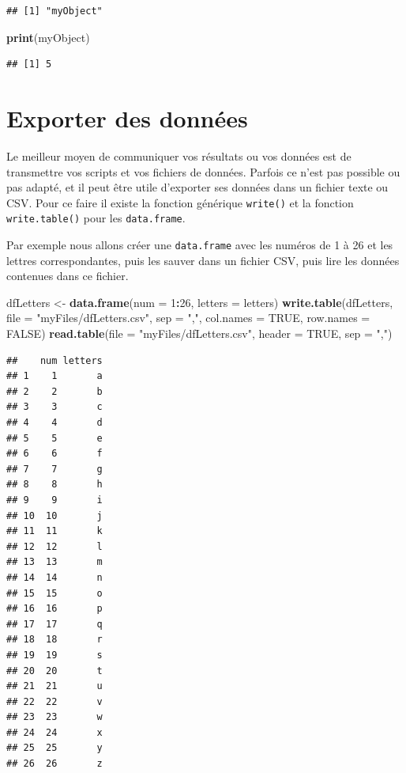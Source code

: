 \documentclass[]{book}
\newenvironment{Shaded}{\begin{snugshade}}{\end{snugshade}}
\newcommand{\DataTypeTok}[1]{\textcolor[rgb]{0.13,0.29,0.53}{#1}}
\newcommand{\DecValTok}[1]{\textcolor[rgb]{0.00,0.00,0.81}{#1}}
\newcommand{\KeywordTok}[1]{\textcolor[rgb]{0.13,0.29,0.53}{\textbf{#1}}}
\newcommand{\NormalTok}[1]{#1}
\newcommand{\OperatorTok}[1]{\textcolor[rgb]{0.81,0.36,0.00}{\textbf{#1}}}
\newcommand{\OtherTok}[1]{\textcolor[rgb]{0.56,0.35,0.01}{#1}}
\newcommand{\StringTok}[1]{\textcolor[rgb]{0.31,0.60,0.02}{#1}}
\begin{document}
\begin{verbatim}
## [1] "myObject"
\end{verbatim}

\begin{Shaded}
\begin{Highlighting}[]
\KeywordTok{print}\NormalTok{(myObject)}
\end{Highlighting}
\end{Shaded}

\begin{verbatim}
## [1] 5
\end{verbatim}

\hypertarget{l016write}{%
\section{Exporter des données}\label{l016write}}

Le meilleur moyen de communiquer vos résultats ou vos données est de transmettre vos scripts et vos fichiers de données. Parfois ce n'est pas possible ou pas adapté, et il peut être utile d'exporter ses données dans un fichier texte ou CSV. Pour ce faire il existe la fonction générique \texttt{write()} et la fonction \texttt{write.table()} pour les \texttt{data.frame}.

Par exemple nous allons créer une \texttt{data.frame} avec les numéros de 1 à 26 et les lettres correspondantes, puis les sauver dans un fichier CSV, puis lire les données contenues dans ce fichier.

\begin{Shaded}
\begin{Highlighting}[]
\NormalTok{dfLetters <-}\StringTok{ }\KeywordTok{data.frame}\NormalTok{(}\DataTypeTok{num =} \DecValTok{1}\OperatorTok{:}\DecValTok{26}\NormalTok{, }\DataTypeTok{letters =}\NormalTok{ letters)}
\KeywordTok{write.table}\NormalTok{(dfLetters, }\DataTypeTok{file =} \StringTok{"myFiles/dfLetters.csv"}\NormalTok{, }
  \DataTypeTok{sep =} \StringTok{","}\NormalTok{, }\DataTypeTok{col.names =} \OtherTok{TRUE}\NormalTok{, }\DataTypeTok{row.names =} \OtherTok{FALSE}\NormalTok{)}
\KeywordTok{read.table}\NormalTok{(}\DataTypeTok{file =} \StringTok{"myFiles/dfLetters.csv"}\NormalTok{, }\DataTypeTok{header =} \OtherTok{TRUE}\NormalTok{, }\DataTypeTok{sep =} \StringTok{","}\NormalTok{)}
\end{Highlighting}
\end{Shaded}

\begin{verbatim}
##    num letters
## 1    1       a
## 2    2       b
## 3    3       c
## 4    4       d
## 5    5       e
## 6    6       f
## 7    7       g
## 8    8       h
## 9    9       i
## 10  10       j
## 11  11       k
## 12  12       l
## 13  13       m
## 14  14       n
## 15  15       o
## 16  16       p
## 17  17       q
## 18  18       r
## 19  19       s
## 20  20       t
## 21  21       u
## 22  22       v
## 23  23       w
## 24  24       x
## 25  25       y
## 26  26       z
\end{verbatim}
\end{document}

